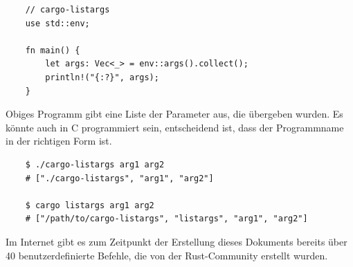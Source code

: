 \begin{lstlisting}
    // cargo-listargs
    use std::env;

    fn main() {
        let args: Vec<_> = env::args().collect();
        println!("{:?}", args);
    }
\end{lstlisting}

Obiges Programm gibt eine Liste der Parameter aus, die übergeben wurden. Es könnte auch in C programmiert sein, entscheidend ist, dass der Programmname in der richtigen Form ist.

\begin{lstlisting}
    $ ./cargo-listargs arg1 arg2
    # ["./cargo-listargs", "arg1", "arg2"]

    $ cargo listargs arg1 arg2
    # ["/path/to/cargo-listargs", "listargs", "arg1", "arg2"]
\end{lstlisting}

Im Internet gibt es zum Zeitpunkt der Erstellung dieses Dokuments bereits über 40 benutzerdefinierte Befehle, die von der Rust-Community erstellt wurden. \cite{CargoSubcommands}
